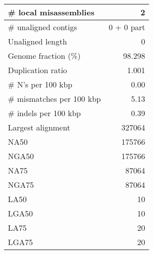 \documentclass[12pt,a4paper]{article}
\begin{document}
\begin{table}[ht]
\begin{center}
\begin{tabular}{|l*{1}{|r}|}
\# local misassemblies & 2 \\ \hline
\# unaligned contigs & 0 + 0 part \\ \hline
Unaligned length & 0 \\ \hline
Genome fraction (\%) & 98.298 \\ \hline
Duplication ratio & 1.001 \\ \hline
\# N's per 100 kbp & 0.00 \\ \hline
\# mismatches per 100 kbp & 5.13 \\ \hline
\# indels per 100 kbp & 0.39 \\ \hline
Largest alignment & 327064 \\ \hline
NA50 & 175766 \\ \hline
NGA50 & 175766 \\ \hline
NA75 & 87064 \\ \hline
NGA75 & 87064 \\ \hline
LA50 & 10 \\ \hline
LGA50 & 10 \\ \hline
LA75 & 20 \\ \hline
LGA75 & 20 \\ \hline
\end{tabular}
\end{center}
\end{table}
\end{document}
